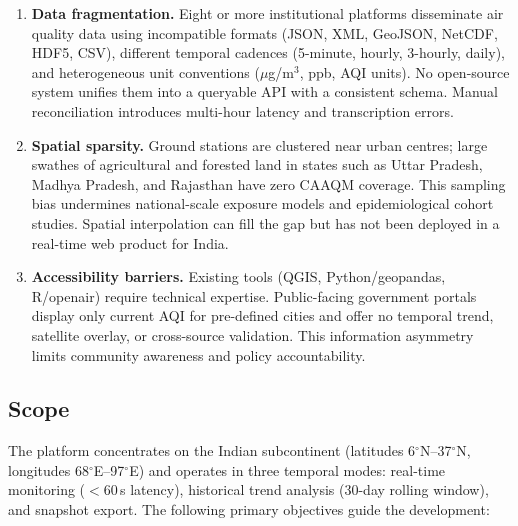 \documentclass[12pt,a4paper]{article}
\begin{document}
\begin{enumerate}[leftmargin=*, label=\textbf{P\arabic*.}]

\item \textbf{Data fragmentation.} Eight or more institutional platforms
      disseminate air quality data using incompatible formats (JSON, XML,
      GeoJSON, NetCDF, HDF5, CSV), different temporal cadences (5-minute,
      hourly, 3-hourly, daily), and heterogeneous unit conventions
      ($\mu$g/m$^3$, ppb, AQI units). No open-source system unifies them
      into a queryable API with a consistent schema. Manual reconciliation
      introduces multi-hour latency and transcription errors.

\item \textbf{Spatial sparsity.} Ground stations are clustered near urban
      centres; large swathes of agricultural and forested land in states such
      as Uttar Pradesh, Madhya Pradesh, and Rajasthan have zero CAAQM coverage.
      This sampling bias undermines national-scale exposure models and
      epidemiological cohort studies. Spatial interpolation can fill the gap
      but has not been deployed in a real-time web product for India.

\item \textbf{Accessibility barriers.} Existing tools (QGIS, Python/geopandas,
      R/openair) require technical expertise. Public-facing government portals
      display only current AQI for pre-defined cities and offer no temporal
      trend, satellite overlay, or cross-source validation. This information
      asymmetry limits community awareness and policy accountability.

\end{enumerate}

\subsection{Scope}
\label{sec:intro:scope}

The platform concentrates on the Indian subcontinent (latitudes
6$^\circ$N--37$^\circ$N, longitudes 68$^\circ$E--97$^\circ$E) and operates
in three temporal modes: real-time monitoring ($<$60\,s latency), historical
trend analysis (30-day rolling window), and snapshot export. The following
primary objectives guide the development:
\end{document}
